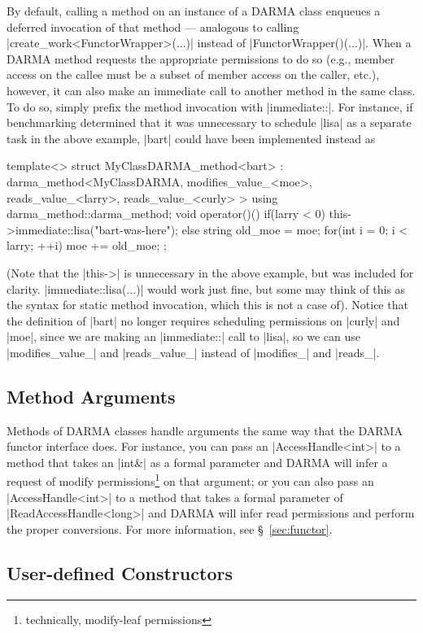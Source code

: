 By default, calling a method on an instance of a DARMA class enqueues a deferred
invocation of that method --- analogous to calling |create_work<FunctorWrapper>(...)|
instead of |FunctorWrapper()(...)|.  When a DARMA method requests the appropriate
permissions to do so (e.g., member access on the callee must be a subset of
member access on the caller, etc.), however, it can also make an immediate call
to another method in the same class.  To do so, simply prefix the method
invocation with |immediate::|.  For instance, if benchmarking determined that
it was unnecessary to schedule |lisa| as a separate task in the above example,
|bart| could have been implemented instead as
\begin{CppCodeNumb}
template<>
struct MyClassDARMA_method<bart>
  : darma_method<MyClassDARMA,
      modifies_value_<moe>,
      reads_value_<larry>,
      reads_value_<curly>
    >
{
  using darma_method::darma_method;
  void operator()() {
    if(larry < 0) this->immediate::lisa("bart-was-here");
    else {
      string old_moe = moe;
      for(int i = 0; i < larry; ++i) moe += old_moe;
    }
  }
};
\end{CppCodeNumb}
(Note that the |this->| is unnecessary in the above example, but was included
for clarity.  |immediate::lisa(...)| would work just fine, but
some may think of this as the syntax for static method invocation, which this
is not a case of).  Notice that the definition of |bart| no longer requires
scheduling permissions on |curly| and |moe|, since we are making an
|immediate::| call to |lisa|, so we can use |modifies_value_| and |reads_value_|
instead of |modifies_| and |reads_|.

\subsection{Method Arguments}

Methods of DARMA classes handle arguments the same way that the DARMA functor
interface does.  For instance, you can pass an |AccessHandle<int>| to a method
that takes an |int&| as a formal parameter and DARMA will infer a request of
modify permissions\footnote{technically, modify-leaf permissions} on that
argument; or you can also pass an |AccessHandle<int>| to a method that takes a
formal parameter of |ReadAccessHandle<long>| and DARMA will infer read
permissions and perform the proper conversions.  For more information, see
\S~\ref{sec:functor}.

\subsection{User-defined Constructors}

